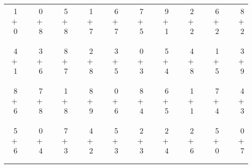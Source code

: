 \documentclass[12pt, letterpaper]{article}
\begin{document}
\begin{tabular}{rrrrrrrrrrrrrrrrrrr}
1 & & 0 & & 5 & & 1 & & 6 & & 7 & & 9 & & 2 & & 6 & & 8\\
$+$ 0 & & $+$ 8 & & $+$ 8 & & $+$ 7 & & $+$ 7 & & $+$ 5 & & $+$ 1 & & $+$ 2 & & $+$ 2 & & $+$ 2\\
\cline{1-1} \cline{3-3} \cline{5-5} \cline{7-7} \cline{9-9} \cline{11-11} \cline{13-13} \cline{15-15} \cline{17-17} \cline{19-19} \\ \\
4 & & 3 & & 8 & & 2 & & 3 & & 0 & & 5 & & 4 & & 1 & & 3\\
$+$ 1 & & $+$ 6 & & $+$ 7 & & $+$ 8 & & $+$ 5 & & $+$ 3 & & $+$ 4 & & $+$ 8 & & $+$ 5 & & $+$ 9\\
\cline{1-1} \cline{3-3} \cline{5-5} \cline{7-7} \cline{9-9} \cline{11-11} \cline{13-13} \cline{15-15} \cline{17-17} \cline{19-19} \\ \\
8 & & 7 & & 1 & & 8 & & 0 & & 8 & & 6 & & 1 & & 7 & & 4\\
$+$ 6 & & $+$ 8 & & $+$ 8 & & $+$ 9 & & $+$ 6 & & $+$ 4 & & $+$ 5 & & $+$ 1 & & $+$ 4 & & $+$ 3\\
\cline{1-1} \cline{3-3} \cline{5-5} \cline{7-7} \cline{9-9} \cline{11-11} \cline{13-13} \cline{15-15} \cline{17-17} \cline{19-19} \\ \\
5 & & 0 & & 7 & & 4 & & 5 & & 2 & & 2 & & 2 & & 5 & & 0\\
$+$ 6 & & $+$ 4 & & $+$ 3 & & $+$ 2 & & $+$ 3 & & $+$ 3 & & $+$ 4 & & $+$ 6 & & $+$ 0 & & $+$ 7\\
\cline{1-1} \cline{3-3} \cline{5-5} \cline{7-7} \cline{9-9} \cline{11-11} \cline{13-13} \cline{15-15} \cline{17-17} \cline{19-19} \\ \\
\end{tabular}
\newpage
\end{document}
